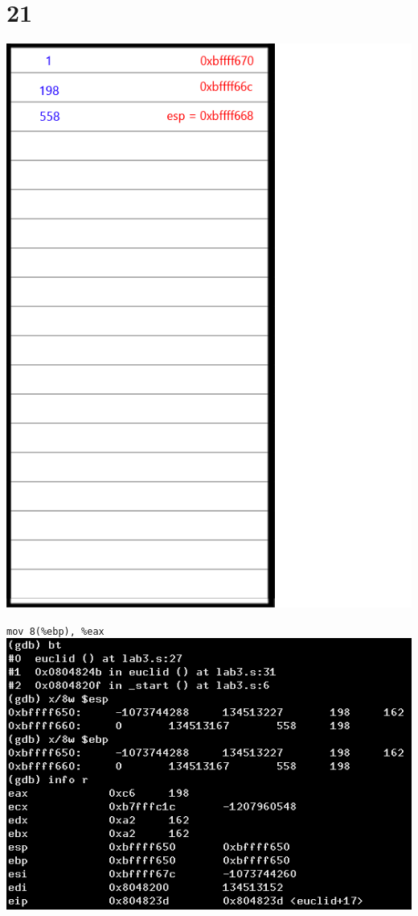 \documentclass{article}
\begin{document}
\section*{21}
\begin{minipage}{5cm}
\includegraphics[scale=0.3]{s3.png}
\end{minipage}
\begin{minipage}{8cm}
\verb|mov 8(%ebp), %eax|\\
\includegraphics[scale=0.4]{bxi21.png} \\
\end{minipage}
\clearpage
\end{document}
